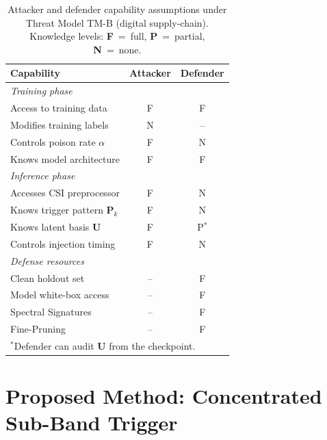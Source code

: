 \documentclass{article}
\begin{document}
\begin{table}[h]
  \caption{Attacker and defender capability assumptions under Threat Model TM-B
           (digital supply-chain).  Knowledge levels: \textbf{F}~=~full,
           \textbf{P}~=~partial, \textbf{N}~=~none.}
  \label{tab:threat_model}
  \centering
  \small
  \begin{tabular}{lcc}
    \toprule
    \textbf{Capability} & \textbf{Attacker} & \textbf{Defender} \\
    \midrule
    \multicolumn{3}{l}{\textit{Training phase}} \\
    Access to training data     & F & F \\
    Modifies training labels    & N & -- \\
    Controls poison rate $\alpha$ & F & N \\
    Knows model architecture    & F & F \\
    \midrule
    \multicolumn{3}{l}{\textit{Inference phase}} \\
    Accesses CSI preprocessor   & F & N \\
    Knows trigger pattern $\mathbf{P}_k$ & F & N \\
    Knows latent basis $\mathbf{U}$      & F & P$^*$ \\
    Controls injection timing   & F & N \\
    \midrule
    \multicolumn{3}{l}{\textit{Defense resources}} \\
    Clean holdout set           & -- & F \\
    Model white-box access      & -- & F \\
    Spectral Signatures~\cite{tran2018spectral} & -- & F \\
    Fine-Pruning~\cite{liu2018finepruning}      & -- & F \\
    \bottomrule
    \multicolumn{3}{l}{\small$^*$Defender can audit $\mathbf{U}$ from the checkpoint.}
  \end{tabular}
\end{table}

\section{Proposed Method: Concentrated Sub-Band Trigger}
\end{document}
